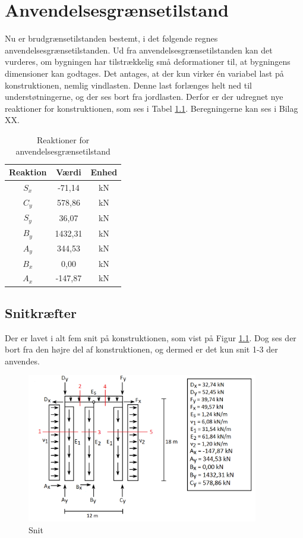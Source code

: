 \chapter{Anvendelsesgrænsetilstand}
Nu er brudgrænsetilstanden bestemt, i det følgende regnes anvendelsesgrænsetilstanden. Ud fra anvendelsesgrænsetilstanden kan det vurderes, om bygningen har tilstrækkelig små deformationer til, at bygningens dimensioner kan godtages. 
\newline \indent{     }  Det antages, at der kun virker én variabel last på konstruktionen, nemlig vindlasten. Denne last forlænges helt ned til understøtningerne, og der ses bort fra jordlasten. Derfor er der udregnet nye reaktioner for konstruktionen, som ses i Tabel \ref{tab:anden}. Beregningerne kan ses i Bilag XX. 

\begin{table}
	\begin{center}
		\begin{tabular}{|c|c|c|}
			\hline
			Reaktion & Værdi & Enhed \\ \hline
			$S_x$ & -71,14 		& kN      \\ \hline
			$C_y$ & 578,86 		& kN      \\ \hline
			$S_y$ & 36,07 		& kN       \\ \hline
			$B_y$ & 1432,31 	& kN      \\ \hline
			$A_y$ & 344,53 		& kN      \\ \hline
			$B_x$ & 0,00 		& kN      \\ \hline
			$A_x$ & -147,87 	& kN       \\ \hline
		\end{tabular}
		\caption{Reaktioner for anvendelsesgrænsetilstand}
		\label{tab:anden}
	\end{center}
\end{table}

\section{Snitkræfter}
Der er lavet i alt fem snit på konstruktionen, som vist på Figur \ref{fig:snitanvendelse}. Dog ses der bort fra den højre del af konstruktionen, og dermed er det kun snit 1-3 der anvendes. 

\begin{figure}[H]
	\centering
	\includegraphics[width=0.9\textwidth]{billeder/snitanvendelse.png}
	\caption{Snit}
	\label{fig:snitanvendelse}
\end{figure}

